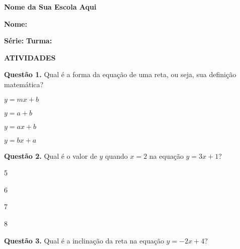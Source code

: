 \documentclass[a4paper,12pt]{article}
\begin{document}
\hspace{-0.6cm} \textbf{Nome da Sua Escola Aqui} \\ 
\vspace{-0.2cm}

\hspace{-0.6cm} \textbf{Nome:} \hrulefill \\
\vspace{-0.2cm}

\hspace{-0.6cm} \textbf{Série:} \makebox[4cm]{\hrulefill} \hspace{0.5cm} \textbf{Turma:} \hrulefill

\vspace{0.5cm}

\begin{center}
    \textbf{ATIVIDADES}
\end{center}


\hspace{-0.4cm} \textbf{Questão 1.} Qual é a forma da equação de uma reta, ou seja, sua definição matemática?

\begin{enumerate}[label=\alph*)]
    \begin{multicols}{2}
        \item $ y = mx + b $
        \item $ y = a + b $
        \item $ y = ax + b $
        \item $ y = bx + a $
    \end{multicols}
\end{enumerate}

\vspace{0.5cm}

\hspace{-0.4cm} \textbf{Questão 2.} Qual é o valor de $y$ quando $x = 2$ na equação $y = 3x + 1$?

\begin{enumerate}[label=\alph*)]
    \begin{multicols}{2}
        \item 5
        \item 6
        \item 7
        \item 8
    \end{multicols}
\end{enumerate}

\vspace{0.5cm}

\hspace{-0.4cm} \textbf{Questão 3.} Qual é a inclinação da reta na equação \(y = -2x + 4\)?
\end{document}
